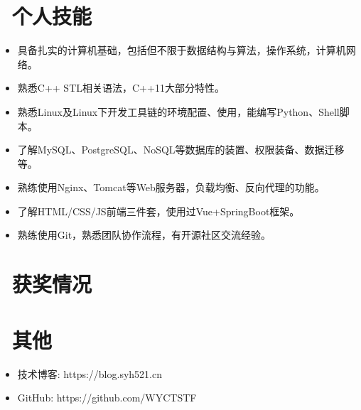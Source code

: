 \documentclass{resume}
\begin{document}

\section{\faCogs\ 个人技能}
\begin{itemize}[parsep=0.5ex]
  \item 具备扎实的计算机基础，包括但不限于数据结构与算法，操作系统，计算机网络。
  \item 熟悉C++ STL相关语法，C++11大部分特性。
  \item 熟悉Linux及Linux下开发工具链的环境配置、使用，能编写Python、Shell脚本。
  \item 了解MySQL、PostgreSQL、NoSQL等数据库的装置、权限装备、数据迁移等。
  \item 熟练使用Nginx、Tomcat等Web服务器，负载均衡、反向代理的功能。
  \item 了解HTML/CSS/JS前端三件套，使用过Vue+SpringBoot框架。
  \item 熟练使用Git，熟悉团队协作流程，有开源社区交流经验。
\end{itemize}

\section{\faHeartO\ 获奖情况}

\section{\faInfo\ 其他}
\begin{itemize}[parsep=0.5ex]
  \item 技术博客: https://blog.syh521.cn
  \item GitHub: https://github.com/WYCTSTF
\end{itemize}

%
%
\end{document}
